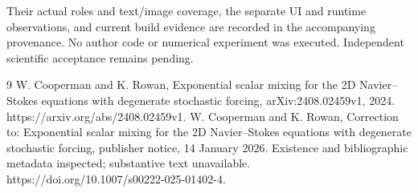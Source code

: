\documentclass[10pt]{article}
\begin{document}
Their actual roles and text/image coverage, the separate UI and runtime observations, and current build evidence are recorded in the accompanying provenance. No author code or numerical experiment was executed. Independent scientific acceptance remains pending.\par
9 W. Cooperman and K. Rowan, Exponential scalar mixing for the 2D Navier–Stokes equations with degenerate stochastic forcing, arXiv:2408.02459v1, 2024. https://arxiv.org/abs/2408.02459v1. W. Cooperman and K. Rowan, Correction to: Exponential scalar mixing for the 2D Navier–Stokes equations with degenerate stochastic forcing, publisher notice, 14 January 2026. Existence and bibliographic metadata inspected; substantive text unavailable. https://doi.org/10.1007/s00222-025-01402-4.\par
\end{document}
